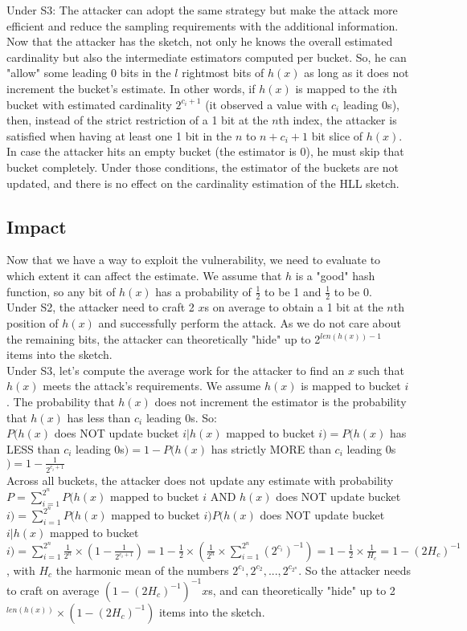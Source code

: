 \documentclass{IEEEtran}
\begin{document}
Under S3: The attacker can adopt the same strategy but make the attack more efficient and reduce the sampling requirements with the additional information. Now that the attacker has the sketch, not only he knows the overall estimated cardinality but also the intermediate estimators computed per bucket. So, he can "allow" some leading 0 bits in the $l$ rightmost bits of $h(x)$ as long as it does not increment the bucket's estimate. In other words, if $h(x)$ is mapped to the $i$th bucket with estimated cardinality $2^{c_i + 1}$ (it observed a value with $c_i$ leading 0s), then, instead of the strict restriction of a 1 bit at the $n$th index, the attacker is satisfied when having at least one 1 bit in the $n$ to $n+c_i + 1$ bit slice of $h(x)$. In case the attacker hits an empty bucket (the estimator is 0), he must skip that bucket completely. Under those conditions, the estimator of the buckets are not updated, and there is no effect on the cardinality estimation of the HLL sketch.

\subsection{Impact}
Now that we have a way to exploit the vulnerability, we need to evaluate to which extent it can affect the estimate. We assume that $h$ is a "good" hash function, so any bit of $h(x)$ has a probability of $\frac{1}{2}$ to be 1 and $\frac{1}{2}$ to be 0.\\

Under S2, the attacker need to craft 2 $x$s on average to obtain a 1 bit at the $n$th position of $h(x)$ and successfully perform the attack. As we do not care about the remaining bits, the attacker can theoretically "hide" up to 2$^{len(h(x))-1}$ items into the sketch.\\

Under S3, let's compute the average work for the attacker to find an $x$ such that $h(x)$ meets the attack's requirements. We assume $h(x)$ is mapped to bucket $i$. The probability that $h(x)$ does not increment the estimator is the probability that $h(x)$ has less than $c_i$ leading 0s. So:\\
$P(h(x)$ does NOT update bucket $i| h(x)$ mapped to bucket $i)=P(h(x)$ has LESS than $c_i$ leading 0s$)=1-P(h(x)$ has strictly MORE than $c_i$ leading 0s$)=1-\frac{1}{2^{c_i+1}}$\\
Across all buckets, the attacker does not update any estimate with probability $P=
\sum_{i=1}^{2^n}P(h(x)$ mapped to bucket $i$ AND $h(x)$ does NOT update bucket $i) = \sum_{i=1}^{2^n}P(h(x)$ mapped to bucket $i)P(h(x)$ does NOT update bucket $i| h(x)$ mapped to bucket $i) = \sum_{i=1}^{2^n}\frac{1}{2^n} \times (1-\frac{1}{2^{c_i+1}}) = 1-\frac{1}{2}\times(\frac{1}{2^n}\times \sum_{i=1}^{2^n} {(2^{c_i})}^{-1}) = 1-\frac{1}{2}\times\frac{1}{H_c} = 1-(2H_c)^{-1}$, with $H_c$ the harmonic mean of the numbers $2^{c_1}, 2^{c_2}, ..., 2^{c_{2^n}}$.
So the attacker needs to craft on average $(1-(2H_c)^{-1})^{-1} x$s, and can theoretically "hide" up to 2$^{len(h(x))}\times (1-(2H_c)^{-1})$ items into the sketch.
\end{document}
